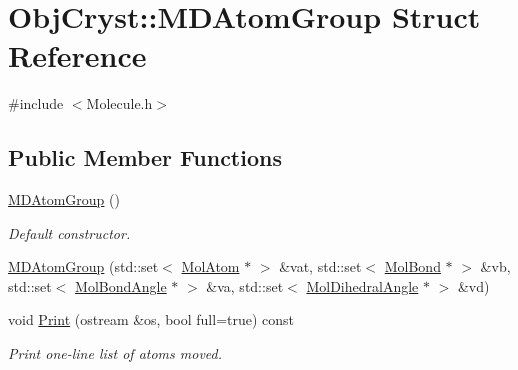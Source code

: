 \hypertarget{struct_obj_cryst_1_1_m_d_atom_group}{}\section{Obj\+Cryst\+::M\+D\+Atom\+Group Struct Reference}
\label{struct_obj_cryst_1_1_m_d_atom_group}


{\ttfamily \#include $<$Molecule.\+h$>$}

\subsection*{Public Member Functions}
\begin{DoxyCompactItemize}
\item 
\mbox{\label{struct_obj_cryst_1_1_m_d_atom_group_a078c9456f28fc82789a4d98e91ef0599}} 
\mbox{\hyperlink{struct_obj_cryst_1_1_m_d_atom_group_a078c9456f28fc82789a4d98e91ef0599}{M\+D\+Atom\+Group}} ()
\begin{DoxyCompactList}\small\item\em Default constructor. \end{DoxyCompactList}\item 
\mbox{\hyperlink{struct_obj_cryst_1_1_m_d_atom_group_a86dd6c6277666fa607685736bdffbedc}{M\+D\+Atom\+Group}} (std\+::set$<$ \mbox{\hyperlink{class_obj_cryst_1_1_mol_atom}{Mol\+Atom}} $\ast$ $>$ \&vat, std\+::set$<$ \mbox{\hyperlink{class_obj_cryst_1_1_mol_bond}{Mol\+Bond}} $\ast$ $>$ \&vb, std\+::set$<$ \mbox{\hyperlink{class_obj_cryst_1_1_mol_bond_angle}{Mol\+Bond\+Angle}} $\ast$ $>$ \&va, std\+::set$<$ \mbox{\hyperlink{class_obj_cryst_1_1_mol_dihedral_angle}{Mol\+Dihedral\+Angle}} $\ast$ $>$ \&vd)
\item 
\mbox{\label{struct_obj_cryst_1_1_m_d_atom_group_a8cba5365ac73ba2bd8b2e7d5587790c9}} 
void \mbox{\hyperlink{struct_obj_cryst_1_1_m_d_atom_group_a8cba5365ac73ba2bd8b2e7d5587790c9}{Print}} (ostream \&os, bool full=true) const
\begin{DoxyCompactList}\small\item\em Print one-\/line list of atoms moved. \end{DoxyCompactList}\end{DoxyCompactItemize}
